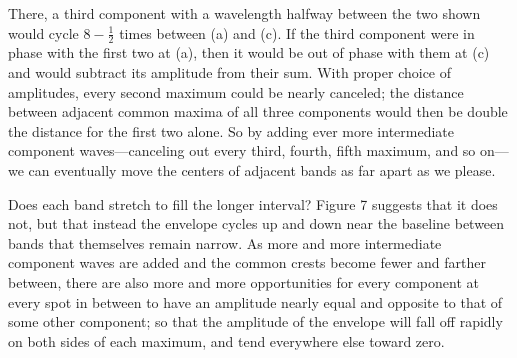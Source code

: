 There, a third component with a wavelength halfway between the two shown
would cycle $8-\frac{1}{2}$ times between (a) and (c). If the third component were in
phase with the first two at (a), then it would be out of phase with them
at (c) and would subtract its amplitude from their sum. With proper
choice of amplitudes, every second maximum could be nearly canceled; the
distance between adjacent common maxima of all three components would
then be double the distance for the first two alone. So by adding ever
more intermediate component waves---canceling out every third, fourth,
fifth maximum, and so on---we can eventually move the centers of
adjacent bands as far apart as we please.

Does each band stretch to fill the longer interval? Figure 7 suggests
that it does not, but that instead the envelope cycles up and down near
the baseline between bands that themselves remain narrow. As more and
more intermediate component waves are added and the common crests become
fewer and farther between, there are also more and more opportunities
for every component at every spot in between to have an amplitude nearly
equal and opposite to that of some other component; so that the
amplitude of the envelope will fall off rapidly on both sides of each
maximum, and tend everywhere else toward zero.


